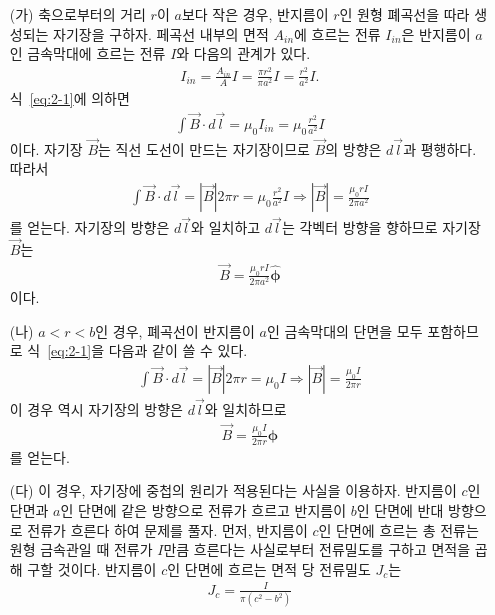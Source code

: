 \documentclass[tightenlines,floatfix,nofootinbib,superscriptaddress,fleqn]{revtex4}
\begin{document}
\begin{itemize}
  \item[(가)]
  축으로부터의 거리 $r$이 $a$보다 작은 경우, 반지름이 $r$인 원형 폐곡선을 따라
  생성되는 자기장을 구하자. 페곡선 내부의 면적 $A_{in}$에 흐르는 전류 $I_{in}$은
  반지름이 $a$인 금속막대에 흐르는 전류 $I$와 다음의 관계가 있다.
  \begin{align}
    I_{in} = \frac{A_{in}}{A}I = \frac{\pi r^2}{\pi a^2}I
    = \frac{r^2}{a^2}I.
  \end{align}
  식~\eqref{eq:2-1}에 의하면
  \begin{align}
    \int \vec{B}\cdot d \vec{l}=\mu_0 I_{in}=\mu_0 \frac{r^2}{a^2}I
  \end{align}
  이다. 자기장 $\vec{B}$는 직선 도선이 만드는 자기장이므로 
  $\vec{B}$의 방향은 $d\vec{l}$과 평행하다. 따라서
  \begin{align}
    \int \vec{B}\cdot d \vec{l} = \left|\vec{B} \right|2\pi r
    =\mu_0\frac{r^2}{a^2}I \Longrightarrow
    \left|\vec{B} \right| = \frac{\mu_0 r I}{2\pi a^2}
  \end{align}
  를 얻는다. 자기장의 방향은 $d\vec{l}$와 일치하고 $d\vec{l}$는 각벡터 방향을
  향하므로 자기장 $\vec{B}$는
  \begin{align}\label{eq:2-1-1}
    \vec{B} = \frac{\mu_0 r I}{2\pi a^2}\hat{\bm \phi}
  \end{align}
  이다.
  \item[(나)]
  $a<r<b$인 경우,  폐곡선이 반지름이 $a$인 금속막대의 단면을 모두 포함하므로
  식~\eqref{eq:2-1}을 다음과 같이 쓸 수 있다.
  \begin{align}
    \int \vec{B}\cdot d \vec{l}=\left|\vec{B} \right|2\pi r=\mu_0 I
    \Longrightarrow 
    \left|\vec{B} \right|=\frac{\mu_0 I}{2\pi r}
  \end{align}
  이 경우 역시 자기장의 방향은 $d\vec{l}$와 일치하므로
  \begin{align}\label{eq:2-2}
    \vec{B} = \frac{\mu_0 I}{2\pi r}\hat{\bm \phi}
  \end{align}
  를 얻는다.
  \item[(다)]
  이 경우, 자기장에 중첩의 원리가 적용된다는 사실을 이용하자.
  반지름이 $c$인 단면과 $a$인 단면에 같은 방향으로 전류가 흐르고
  반지름이 $b$인 단면에 반대 방향으로 전류가 흐른다 하여 문제를 풀자.
  먼저, 반지름이 $c$인 단면에 흐르는 총 전류는 원형 금속관일 때 전류가 $I$만큼 
  흐른다는 사실로부터 전류밀도를 구하고 면적을 곱해 구할 것이다.
  반지름이 $c$인 단면에 흐르는 면적 당 전류밀도 $J_c$는
  \begin{align}
    J_c = \frac{I}{\pi(c^2-b^2)}

\end{align}
\end{itemize}
\end{document}
